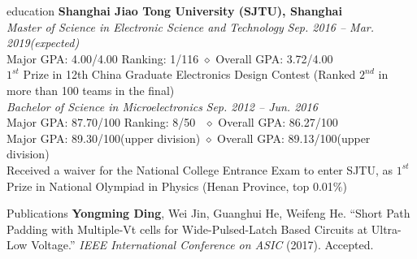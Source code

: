\documentclass{resume_Stanford} %
\begin{document}

\begin{rSection}{education}
\textbf{Shanghai Jiao Tong University (SJTU), Shanghai}
\\\emph{Master of Science in Electronic Science and Technology} \hfill \emph{Sep. 2016 -- Mar. 2019(expected)}
\\\bm{$\diamond$} Major GPA: 4.00/4.00 \qquad Ranking: 1/116 \qquad $\diamond$ Overall GPA: 3.72/4.00
\\\bm{$\diamond$} $1^{st}$ Prize in 12th China Graduate Electronics Design Contest (Ranked $2^{nd}$ in more than 100 teams in the final)
\\\emph{Bachelor of Science in Microelectronics} \hfill \emph{Sep. 2012 -- Jun. 2016}
\\\bm{$\diamond$} Major GPA: 87.70/100 \qquad Ranking: 8/50 \qquad \ $\diamond$ Overall GPA: 86.27/100
\\\bm{$\diamond$} Major GPA: 89.30/100(upper division) \qquad \qquad$\diamond$ Overall GPA: 89.13/100(upper division)
\\\bm{$\diamond$} Received a waiver for the National College Entrance Exam to enter SJTU, as $1^{st}$ Prize in National Olympiad in Physics (Henan Province, top 0.01$\%$)
\end{rSection}

\begin{rSection}{Publications}
\textbf{Yongming Ding}, Wei Jin, Guanghui He, Weifeng He. ``Short Path Padding with Multiple-Vt cells for Wide-Pulsed-Latch Based Circuits at Ultra-Low Voltage.'' \emph{IEEE International Conference on ASIC}  (2017). Accepted.
\end{rSection}
\end{document}

